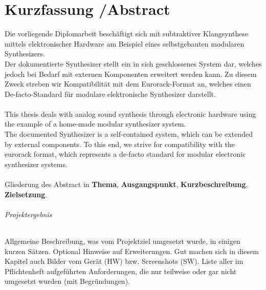 \chapter*{Kurzfassung /Abstract }
\label{cha:abstract}

Die vorliegende Diplomarbeit beschäftigt sich mit subtraktiver Klangsynthese mittels elektronischer Hardware am Beispiel eines selbstgebauten modularen Synthesizers. \\

Der dokumentierte Synthesizer stellt ein in sich geschlossenes System dar, welches jedoch bei Bedarf mit externen Komponenten erweitert werden kann. Zu diesem Zweck streben wir Kompatibilität mit dem Eurorack-Format an, welches einen De-facto-Standard für modulare elektronische Synthesizer darstellt. \\ \\


This thesis deals with analog sound synthesis through electronic hardware using the example of a home-made modular synthesizer system. \\

The documented Synthesizer is a self-contained system, which can be extended by external components. To this end, we strive for compatibility with the eurorack format, which represents a de-facto standard for modular electronic synthesizer systems. \\ \\

Gliederung des Abstract in \textbf{Thema}, \textbf{Ausgangspunkt}, \textbf{Kurzbeschreibung}, \textbf{Zielsetzung}.  

\subparagraph{Projektergebnis}

Allgemeine Beschreibung, was vom Projektziel umgesetzt wurde, in einigen kurzen Sätzen. Optional Hinweise auf Erweiterungen. Gut machen sich in diesem Kapitel auch Bilder vom Gerät (HW) bzw. Screenshots (SW).
Liste aller im Pflichtenheft aufgeführten Anforderungen, die nur teilweise oder gar nicht umgesetzt wurden (mit Begründungen).
